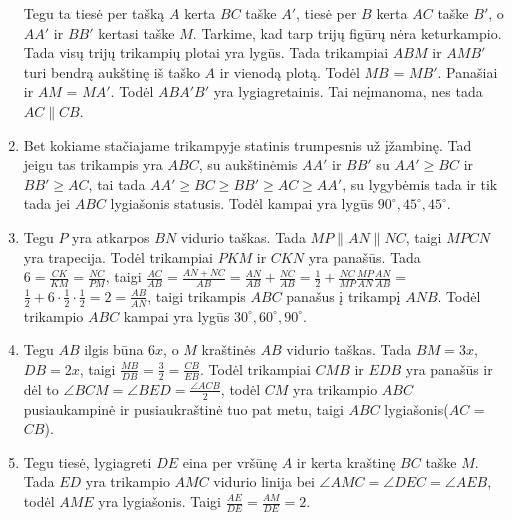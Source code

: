 \begin{enumerate}
  Tegu ta tiesė per tašką $A$ kerta $BC$ taške $A'$, tiesė per $B$ kerta
  $AC$ taške $B'$, o $AA'$ ir $BB'$ kertasi taške $M$. Tarkime, kad tarp
  trijų figūrų nėra keturkampio. Tada visų trijų trikampių plotai yra
  lygūs.  Tada trikampiai $ABM$ ir $AMB'$ turi bendrą aukštinę iš taško
  $A$ ir vienodą plotą. Todėl $MB$ = $MB'$. Panašiai ir $AM$ = $MA'$.
  Todėl $ABA'B'$ yra lygiagretainis. Tai neįmanoma, nes tada $AC
  \parallel{CB}$.
\item
  Bet kokiame stačiajame trikampyje statinis trumpesnis už įžambinę. Tad
  jeigu tas trikampis yra $ABC$, su aukštinėmis $AA'$ ir $BB'$ su $AA'
  \geq BC$ ir $BB' \geq AC$, tai tada $AA' \geq BC \geq BB' \geq AC \geq
  AA'$, su lygybėmis tada ir tik tada jei $ABC$ lygiašonis statusis.
  Todėl kampai yra lygūs $90^\circ ,45^\circ ,45^\circ$.
\item
  Tegu $P$ yra atkarpos $BN$ vidurio taškas. Tada $MP \parallel{AN}
  \parallel{NC}$, taigi $MPCN$ yra trapecija.  Todėl trikampiai $PKM$ ir
  $CKN$ yra panašūs.  Tada $6=\frac{CK}{KM}=\frac{NC}{PM}$, taigi
  $\frac{AC}{AB} = \frac{AN+NC}{AB} = \frac{AN}{AB} + \frac{NC}{AB} =
  \frac{1}{2} + \frac{NC}{MP}\frac{MP}{AN}\frac{AN}{AB} = $ $\frac{1}{2} +
  6\cdot\frac{1}{2}\cdot\frac{1}{2} = 2 = \frac{AB}{AN}$, taigi trikampis
  $ABC$ panašus į trikampį $ANB$. Todėl trikampio $ABC$ kampai yra lygūs
  $30^\circ, 60^\circ, 90^\circ$. 
\item
  Tegu $AB$ ilgis būna $6x$, o $M$ kraštinės $AB$ vidurio taškas. Tada $BM
  = 3x$, $DB = 2x$, taigi $\frac{MB}{DB} = \frac{3}{2} = \frac{CB}{EB}$.
  Todėl trikampiai $CMB$ ir $EDB$ yra panašūs ir dėl to $\angle BCM =
  \angle BED = \frac{\angle ACB}{2}$, todėl $CM$ yra trikampio $ABC$
  pusiaukampinė ir pusiaukraštinė tuo pat metu, taigi $ABC$
  lygiašonis($AC$ = $CB$).
\item
  Tegu tiesė, lygiagreti $DE$ eina per vršūnę $A$ ir kerta kraštinę $BC$
  taške $M$. Tada $ED$ yra trikampio $AMC$ vidurio linija bei $\angle AMC
  = \angle DEC = \angle AEB$, todėl $AME$ yra lygiašonis. Taigi
  $\frac{AE}{DE} = \frac{AM}{DE} = 2$.
\end{enumerate} 

